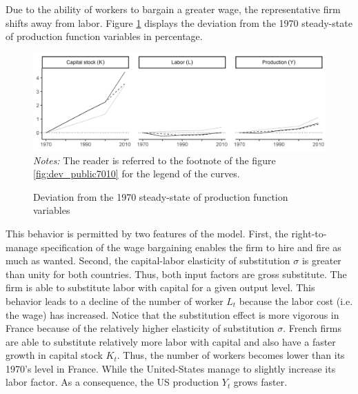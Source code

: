 Due to the ability of workers to bargain a greater wage, the representative firm shifts away from labor. Figure \ref{fig:dev_prod7010} displays the deviation from the 1970 steady-state of production function variables in percentage.
\begin{figure}[tb]
	\centering
	\caption{Deviation from the 1970 steady-state of production function variables} \label{fig:dev_prod7010}
	\includegraphics[width=1\linewidth]{../result/deviation/dev_prod7010.png}
	\vspace{-6ex}
	\justify\singlespacing\footnotesize \textit{Notes:} The reader is referred to the footnote of the figure \ref{fig:dev_public7010} for the legend of the curves.
\end{figure}
This behavior is permitted by two features of the model. First, the right-to-manage specification of the wage bargaining enables the firm to hire and fire as much as wanted. Second, the capital-labor elasticity of substitution $\sigma$ is greater than unity for both countries. Thus, both input factors are gross substitute. The firm is able to substitute labor with capital for a given output level. This behavior leads to a decline of the number of worker $L_t$ because the labor cost (i.e. the wage) has increased. Notice that the substitution effect is more vigorous in France because of the relatively higher elasticity of substitution $\sigma$. French firms are able to substitute relatively more labor with capital and also have a faster growth in capital stock $K_t$. Thus, the number of workers becomes lower than its 1970's level in France. While the United-States manage to slightly increase its labor factor. As a consequence, the US production $Y_t$ grows faster.

